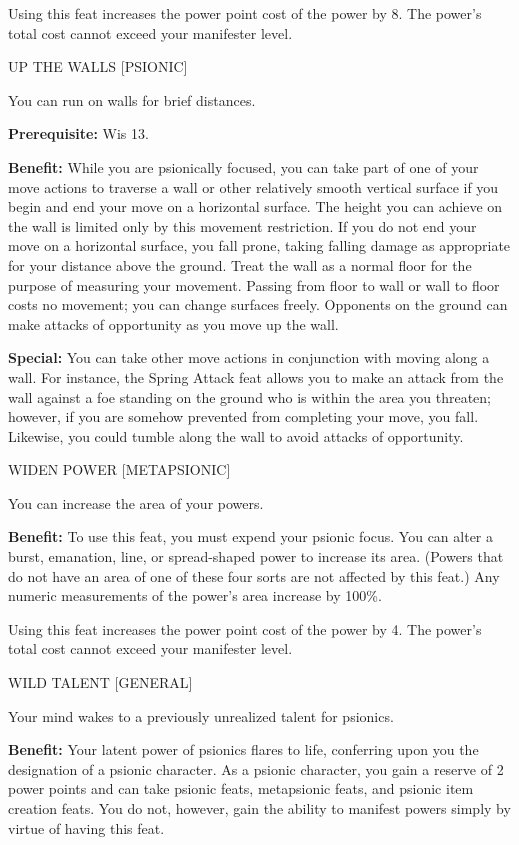 \documentclass{article}
\begin{document}
Using this feat increases the power point cost of the power by 8. The power's total 
cost cannot exceed your manifester level.

\vspace{12pt}
UP THE WALLS [PSIONIC]

You can run on walls for brief distances.

\textbf{Prerequisite:} Wis 13.

\textbf{Benefit:} While you are psionically focused, you can take part of one of 
your move actions to traverse a wall or other relatively smooth vertical surface 
if you begin and end your move on a horizontal surface. The height you can achieve 
on the wall is limited only by this movement restriction. If you do not end your 
move on a horizontal surface, you fall prone, taking falling damage as appropriate 
for your distance above the ground. Treat the wall as a normal floor for the purpose 
of measuring your movement. Passing from floor to wall or wall to floor costs no 
movement; you can change surfaces freely. Opponents on the ground can make attacks 
of opportunity as you move up the wall.

\textbf{Special:} You can take other move actions in conjunction with moving along 
a wall. For instance, the Spring Attack feat allows you to make an attack from 
the wall against a foe standing on the ground who is within the area you threaten; 
however, if you are somehow prevented from completing your move, you fall. Likewise, 
you could tumble along the wall to avoid attacks of opportunity.

\vspace{12pt}
WIDEN POWER [METAPSIONIC]

You can increase the area of your powers.

\textbf{Benefit:} To use this feat, you must expend your psionic focus. You can 
alter a burst, emanation, line, or spread-shaped power to increase its area. (Powers 
that do not have an area of one of these four sorts are not affected by this feat.) 
Any numeric measurements of the power's area increase by 100\%.

Using this feat increases the power point cost of the power by 4. The power's total 
cost cannot exceed your manifester level.

\vspace{12pt}
WILD TALENT [GENERAL]

Your mind wakes to a previously unrealized talent for psionics.

\textbf{Benefit:} Your latent power of psionics flares to life, conferring upon 
you the designation of a psionic character. As a psionic character, you gain a 
reserve of 2 power points and can take psionic feats, metapsionic feats, and psionic 
item creation feats. You do not, however, gain the ability to manifest powers simply 
by virtue of having this feat.
\end{document}
